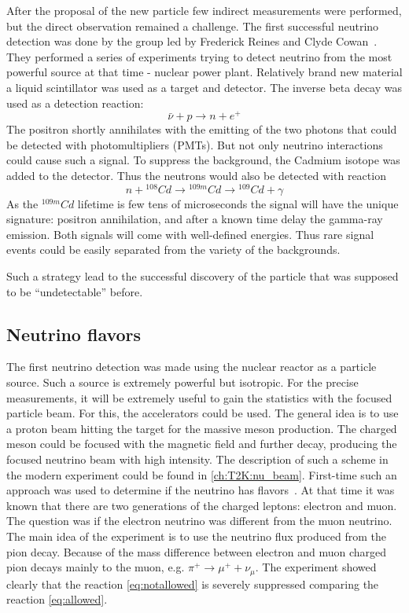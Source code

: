 \documentclass[../main.tex]{subfiles}
\begin{document}
After the proposal of the new particle few indirect measurements were performed, but the direct observation remained a challenge. The first successful neutrino detection was done by the group led by Frederick Reines and Clyde Cowan~\cite{Cowan1956}. They performed a series of experiments trying to detect neutrino from the most powerful source at that time - nuclear power plant. Relatively brand new material a liquid scintillator was used as a target and detector. The inverse beta decay was used as a detection reaction:
\begin{equation}
\bar{\nu}+p\to n+e^+
\end{equation}
The positron shortly annihilates with the emitting of the two photons that could be detected with photomultipliers (PMTs). But not only neutrino interactions could cause such a signal. To suppress the background, the Cadmium isotope was added to the detector. Thus the neutrons would also be detected with reaction
\begin{equation}
n+{}^{108}Cd\to{}^{109m}Cd\to{}^{109}Cd+\gamma
\end{equation}
As the ${}^{109m}Cd$ lifetime is few tens of microseconds the signal will have the unique signature: positron annihilation, and after a known time delay the gamma-ray emission. Both signals will come with well-defined energies. Thus rare signal events could be easily separated from the variety of the backgrounds.

Such a strategy lead to the successful discovery of the particle that was supposed to be ``undetectable'' before.

\subsection{Neutrino flavors}
\label{sec:dublet}
The first neutrino detection was made using the nuclear reactor as a particle source. Such a source is extremely powerful but isotropic. For the precise measurements, it will be extremely useful to gain the statistics with the focused particle beam. For this, the accelerators could be used. The general idea is to use a proton beam hitting the target for the massive meson production. The charged meson could be focused with the magnetic field and further decay, producing the focused neutrino beam with high intensity. The description of such a scheme in the modern experiment could be found in \autoref{ch:T2K:nu_beam}. First-time such an approach was used to determine if the neutrino has flavors~\cite{Danby1962}. At that time it was known that there are two generations of the charged leptons: electron and muon. The question was if the electron neutrino was different from the muon neutrino. The main idea of the experiment is to use the neutrino flux produced from the pion decay. Because of the mass difference between electron and muon charged pion decays mainly to the muon, e.g. $\pi^+\to\mu^++\nu_\mu$. The experiment showed clearly that the reaction \autoref{eq:notallowed} is severely suppressed comparing the reaction \autoref{eq:allowed}.
\end{document}
